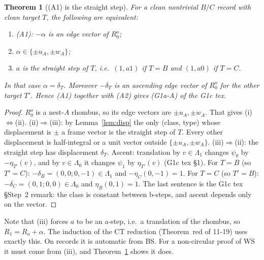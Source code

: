 \documentclass[11pt]{article}
\newtheorem{theorem}{Theorem}\newtheorem{lemma}[theorem]{Lemma}\newtheorem{proposition}[theorem]{Proposition}
\theoremstyle{definition}\newtheorem{definition}[theorem]{Definition}\newtheorem{remark}[theorem]{Remark}
\begin{document}
\begin{theorem}[(A1) is the straight step]\label{thm:red}
For a clean nontrivial $B/C$ record with clean target $T$, the following are equivalent:
\begin{enumerate}
\item[(i)] (A1): $-\alpha$ is an edge vector of $R_0^o$;
\item[(ii)] $\alpha\in\{\pm u_A,\pm w_A\}$;
\item[(iii)] $a$ is the straight step of $T$, i.e.\ $(1,a1)$ if $T=B$ and $(1,a0)$ if $T=C$.
\end{enumerate}
In that case $\alpha=\delta_T$. Moreover $-\delta_T$ is an \emph{ascending} edge vector of $R_0^o$ for the other target $T'$. Hence (A1) together with (A2) gives (G1a-A) of the G1c tex.
\end{theorem}
\begin{proof}
$R_0^o$ is a nest-$A$ rhombus, so its edge vectors are $\pm u_A,\pm w_A$. That gives (i)$\iff$(ii).
(ii)$\Rightarrow$(iii): by Lemma~\ref{lem:disp} the only (class, type) whose displacement is $\pm$ a frame vector is the straight step of $T$. Every other displacement is half-integral or a unit vector outside $\{\pm u_A,\pm w_A\}$. (iii)$\Rightarrow$(ii): the straight step has displacement $\delta_T$.
Ascent: translation by $v\in\Lambda_1$ changes $\psi_0$ by $-\eta_{T'}(v)$, and by $v\in\Lambda_0$ it changes $\psi_1$ by $\eta_{T'}(v)$ (G1c tex \S1).
For $T=B$ (so $T'=C$): $-\delta_B=(0,0;0,-1)\in\Lambda_1$ and $-\eta_C(0,-1)=1$. For $T=C$ (so $T'=B$): $-\delta_C=(0,1;0,0)\in\Lambda_0$ and $\eta_B(0,1)=1$.
The last sentence is the G1c tex \S Step~2 remark: the class is constant between b-steps, and ascent depends only on the vector.
\end{proof}
\noindent Note that (iii) forces $a$ to be an a-step, i.e.\ a translation of the rhombus, so $R_1=R_a+\alpha$. The induction of the CT reduction (Theorem~red of 11-19) uses exactly this. On records it is automatic from BS. For a non-circular proof of WS it must come from (iii), and Theorem~\ref{thm:red} shows it does.
\end{document}
